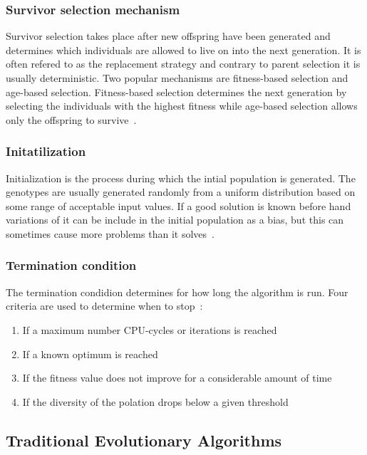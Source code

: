 \subsubsection{Survivor selection mechanism}

Survivor selection takes place after new offspring have been generated and determines which individuals are allowed to live on into the next generation. It is often refered to as the replacement strategy and contrary to parent selection it is usually deterministic. Two popular mechanisms are fitness-based selection and age-based selection. Fitness-based selection determines the next generation by selecting the individuals with the highest fitness while age-based selection allows only the offspring to survive~\cite{Eiben2015_whatevolutionary}.



\subsubsection{Initatilization}

Initialization is the process during which the intial population is generated. The genotypes are usually generated randomly from a uniform distribution based on some range of acceptable input values. If a good solution is known before hand variations of it can be include in the initial population as a bias, but this can sometimes cause more problems than it solves~\cite{Eiben20021}.

\subsubsection{Termination condition}

The termination condidion determines for how long the algorithm is run. Four criteria are used to determine when to stop~\cite{Eiben2015_whatevolutionary}:

\begin{enumerate}
  \item If a maximum number CPU-cycles or iterations is reached
  \item If a known optimum is reached
  \item If the fitness value does not improve for a considerable amount of time
  \item If the diversity of the polation drops below a given threshold
\end{enumerate}

\subsection{Traditional Evolutionary Algorithms}

